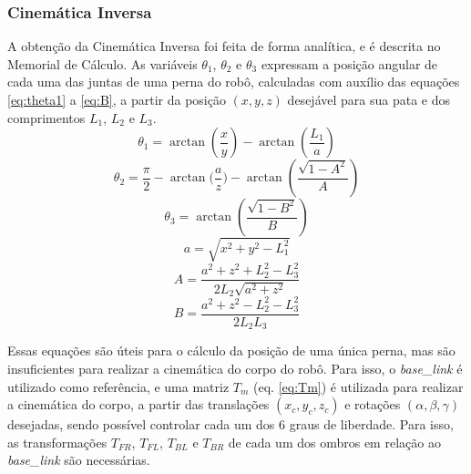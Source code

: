 \documentclass[../main.tex]{subfiles}
\begin{document}
  \subsubsection{Cinemática Inversa}
  A obtenção da Cinemática Inversa foi feita de forma analítica, e é descrita no Memorial de Cálculo. As variáveis $\theta_1$, $\theta_2$ e $\theta_3$ expressam a posição angular de cada uma das juntas de uma perna do robô, calculadas com auxílio das equações \ref{eq:theta1} a \ref{eq:B}, a partir da posição $(x, y, z)$ desejável para sua pata e dos comprimentos $L_1$, $L_2$ e $L_3$.
  \begin{equation}
    \label{eq:theta1}
    \theta_1 = \arctan{(\frac{x}{y})} - \arctan{(\frac{L_1}{a})}
  \end{equation}
  \begin{equation}
    \label{eq:theta2}
    \theta_2 = \frac{\pi}{2} - \arctan{(\frac{a}{z}}) - \arctan{(\frac{\sqrt{1-A^2}}{A})}
  \end{equation}
  \begin{equation}
    \label{eq:theta3}
    \theta_3 = \arctan(\frac{\sqrt{1-B^2}}{B})
  \end{equation}
  \begin{equation}
    \label{eq:a}
    a = \sqrt{x^2+y^2-L_1^2}
  \end{equation}
  \begin{equation}
    \label{eq:A}
    A =\frac{a^2+z^2+L_2^2-L_3^2}{2L_2\sqrt{a^2+z^2}}
  \end{equation}
  \begin{equation}
    \label{eq:B}
    B = \frac{a^2+z^2-L_2^2-L_3^2}{2L_2L_3}
  \end{equation}

  Essas equações são úteis para o cálculo da posição de uma única perna, mas são insuficientes para realizar a cinemática do corpo do robô. Para isso, o \textit{base\_link} é utilizado como referência, e uma matriz $T_m$ (eq. \ref{eq:Tm}) é utilizada para realizar a cinemática do corpo, a partir das translações $(x_c, y_c, z_c)$ e rotações $(\alpha, \beta, \gamma)$ desejadas, sendo possível controlar cada um dos 6 graus de liberdade. Para isso, as transformações $T_{FR}$, $T_{FL}$, $T_{BL}$ e $T_{BR}$ de cada um dos ombros em relação ao \textit{base\_link} são necessárias.
\end{document}

